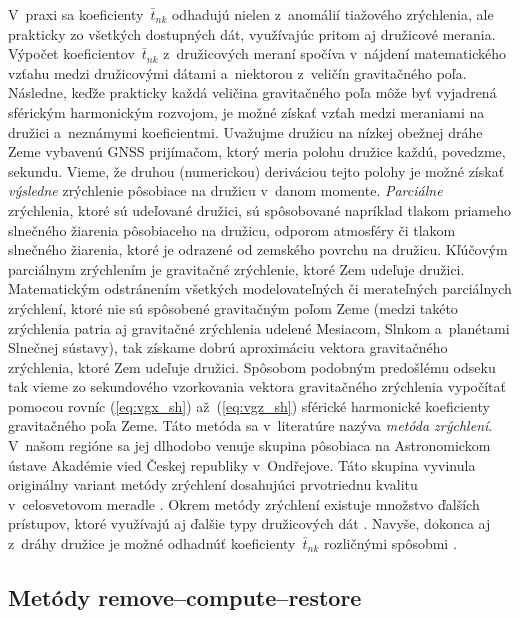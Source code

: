 \documentclass[a4paper,12pt]{book}
\begin{document}
V~praxi sa koeficienty~$\bar{t}_{nk}$ odhadujú nielen z~anomálií tiažového 
zrýchlenia, ale prakticky zo všetkých dostupných dát, využívajúc pritom aj 
družicové merania.  Výpočet koeficientov~$\bar{t}_{nk}$ z~družicových meraní 
spočíva v~nájdení matematického vzťahu medzi družicovými dátami a~niektorou 
z~veličín gravitačného poľa.  Následne, keďže prakticky každá veličina 
gravitačného poľa môže byť vyjadrená sférickým harmonickým rozvojom, je možné 
získať vzťah medzi meraniami na družici a~neznámymi koeficientmi.  Uvažujme 
družicu na nízkej obežnej dráhe Zeme vybavenú GNSS prijímačom, ktorý meria 
polohu družice každú, povedzme, sekundu.  Vieme, že druhou (numerickou) 
deriváciou tejto polohy je možné získať \emph{výsledne} zrýchlenie pôsobiace na 
družicu v~danom momente.  \emph{Parciálne} zrýchlenia, ktoré sú udeľované 
družici, sú spôsobované napríklad tlakom priameho slnečného žiarenia 
pôsobiaceho na družicu, odporom atmosféry či tlakom slnečného žiarenia, ktoré 
je odrazené od zemského povrchu na družicu.  Kľúčovým parciálnym zrýchlením je 
gravitačné zrýchlenie, ktoré Zem udeľuje družici.  Matematickým odstránením 
všetkých modelovateľných či merateľných parciálnych zrýchlení, ktoré nie sú 
spôsobené gravitačným poľom Zeme (medzi takéto zrýchlenia patria aj gravitačné 
zrýchlenia udelené Mesiacom, Slnkom a~planétami Slnečnej sústavy), tak získame 
dobrú aproximáciu vektora gravitačného zrýchlenia, ktoré Zem udeľuje družici.  
Spôsobom podobným predošlému odseku tak vieme zo sekundového vzorkovania 
vektora gravitačného zrýchlenia vypočítať pomocou rovníc (\ref{eq:vgx_sh}) 
až~(\ref{eq:vgz_sh}) sférické harmonické koeficienty gravitačného poľa Zeme.  
Táto metóda sa v~literatúre nazýva \emph{metóda zrýchlení}.   V~našom regióne 
sa jej dlhodobo venuje skupina pôsobiaca na Astronomickom ústave Akadémie vied 
Českej republiky v~Ond\v{r}ejove.  Táto skupina vyvinula originálny variant 
metódy zrýchlení dosahujúci prvotriednu kvalitu v~celosvetovom meradle 
\parencite{Bezdek2014,encarnacao2020}.  Okrem metódy zrýchlení existuje 
množstvo ďalších prístupov, ktoré využívajú aj ďalšie typy družicových dát 
\parencite[pozri][]{SeeberSatelliteGeodesy}.  Navyše, dokonca aj z~dráhy 
družice je možné odhadnúť koeficienty~$\bar{t}_{nk}$ rozličnými spôsobmi 
\parencite[napríklad][]{Baur2014}.


\subsection{Metódy remove--compute--restore}
\end{document}
